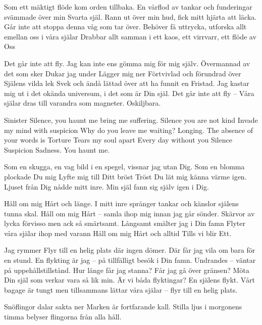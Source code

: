\startpoem
Som ett mäktigt flöde kom orden tillbaka.
En vårflod av tankar och funderingar svämmade
över min Svarta själ.
Rann ut över  min hud, fick mitt hjärta att läcka.
Går inte att stoppa denna våg som tar över.
Behöver få uttrycka, utforska allt emellan oss
i våra själar 
Drabbar allt samman i ett kaos,
ett virrvarr, 
ett flöde av
Oss
\stoppoem

\startpoem
Det går inte att fly.
Jag kan inte ens gömma mig för mig själv.
Övermannad av det som sker
Dukar jag under
Lägger mig ner
Förtvivlad och förundrad över
Själens vilda lek
Svek
och ändå lättad över att ha funnit en
Fristad.
Jag kastar mig ut i det okända universum,
i det som är Din själ.
Det går inte att fly – 
Våra själar dras till varandra som magneter.
Oskiljbara.
\stoppoem

\startpoem
Sinister Silence,
you haunt me
bring me suffering.
Silence you are not kind
Invade my mind with suspicion
Why do you leave me waiting?
Longing.
The absence of your words is 
Torture
Tears my soul apart
Every day without you
Silence
Suspicion
Sadness.
You haunt me.
\stoppoem

\startpoem
Som en skugga,
en vag bild i en spegel, 
vissnar jag utan Dig.
Som en blomma plockade Du mig
Lyfte mig till Ditt bröst
Tröst
Du lät mig känna värme igen.
Ljuset från Dig nådde mitt inre.
Min själ fann sig själv igen 
i Dig.
\stoppoem

\startpoem
Håll om mig
Hårt och länge.
I mitt inre spränger tankar och känslor
själens tunna skal.
Håll om mig
Hårt – samla ihop mig
innan jag går sönder.
Skärvor av lycka förvisso men
ack så smärtsamt.
Långsamt smälter jag i Din famn
Flyter våra själar ihop med varann
Håll om mig
Hårt och alltid
Tills vi blir
Ett.
\stoppoem

\startpoem
Jag rymmer
Flyr till en helig plats
där ingen dömer.
Där får jag vila om bara för en stund.
En flykting är jag – 
på tillfälligt besök i Din famn.
Undrandes – väntar på uppehållstillstånd.
Hur länge får jag stanna?
Får jag gå över gränsen?
Möta Din själ som verkar vara så lik min.
Är vi båda flyktingar?
En själens flykt.
Vårt bagage är tungt men
tillsammans lättar våra själar – 
flyr till en helig plats.
\stoppoem

\startpoem
Snöflingor dalar sakta ner
Marken är fortfarande kall.
Stilla ljus i morgonens timma 
belyser flingorna från alla håll.


